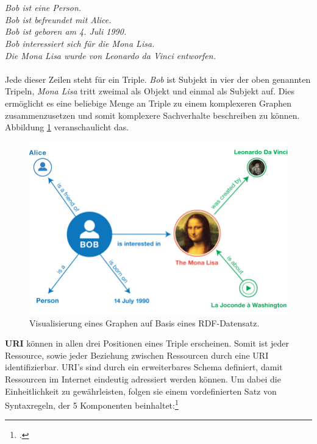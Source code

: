 \documentclass[12pt,a4paper]{article}
\begin{document}
\\
\\
\textit{Bob ist eine Person.\\
Bob ist befreundet mit Alice.\\
Bob ist geboren am 4. Juli 1990. \\
Bob interessiert sich für die Mona Lisa.\\
Die Mona Lisa wurde von Leonardo da Vinci entworfen.}
\\
\\
Jede dieser Zeilen steht für ein Triple. \textit{Bob} ist Subjekt in vier der oben genannten Tripeln, \textit{Mona Lisa} tritt zweimal als Objekt und einmal als Subjekt auf. Dies ermöglicht es eine beliebige Menge an Triple zu einem komplexeren Graphen zusammenzusetzen und somit komplexere Sachverhalte beschreiben zu können. Abbildung \ref{fig:rdf_example} veranschaulicht das.
\begin{figure}[H]
  \centering
	\includegraphics[width=1\textwidth]{img/rdf_example.png}  
    \caption[Visualisierung eines Graphen auf Basis eines RDF-Datensatz, \protect\url{https://www.w3.org/TR/rdf11-primer/}, 10.04.2019.]{Visualisierung eines Graphen auf Basis eines RDF-Datensatz.}
  	\label{fig:rdf_example}
\end{figure}
\textbf{URI} können in allen drei Positionen eines Triple erscheinen. Somit ist jeder Ressource, sowie jeder Beziehung zwischen Ressourcen durch eine URI identifizierbar. URI's sind durch ein erweiterbares Schema definiert, damit Ressourcen im Internet eindeutig adressiert werden können. Um dabei die Einheitlichkeit zu gewährleisten, folgen sie einem vordefinierten Satz von Syntaxregeln, der 5 Komponenten beinhaltet:\footcite[Vgl.][]{berners2004uniform}
\end{document}
